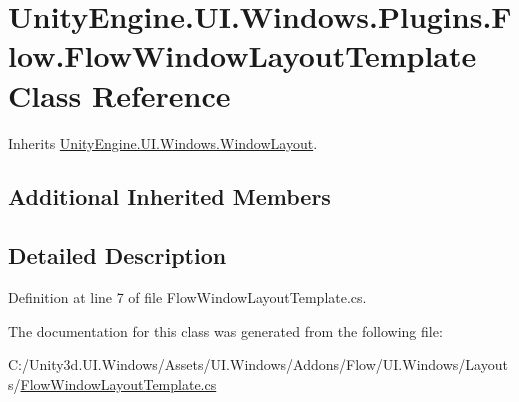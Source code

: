 \hypertarget{class_unity_engine_1_1_u_i_1_1_windows_1_1_plugins_1_1_flow_1_1_flow_window_layout_template}{}\section{Unity\+Engine.\+U\+I.\+Windows.\+Plugins.\+Flow.\+Flow\+Window\+Layout\+Template Class Reference}
\label{class_unity_engine_1_1_u_i_1_1_windows_1_1_plugins_1_1_flow_1_1_flow_window_layout_template}


Inherits \hyperlink{class_unity_engine_1_1_u_i_1_1_windows_1_1_window_layout}{Unity\+Engine.\+U\+I.\+Windows.\+Window\+Layout}.

\subsection*{Additional Inherited Members}


\subsection{Detailed Description}


Definition at line 7 of file Flow\+Window\+Layout\+Template.\+cs.



The documentation for this class was generated from the following file\+:\begin{DoxyCompactItemize}
\item 
C\+:/\+Unity3d.\+U\+I.\+Windows/\+Assets/\+U\+I.\+Windows/\+Addons/\+Flow/\+U\+I.\+Windows/\+Layouts/\hyperlink{_flow_window_layout_template_8cs}{Flow\+Window\+Layout\+Template.\+cs}\end{DoxyCompactItemize}
